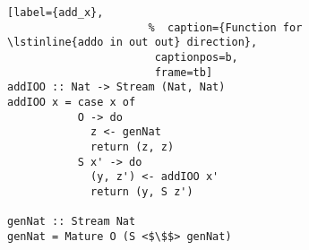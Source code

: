 \begin{figure}[!t]
  \centering
  \begin{minipage}{\columnwidth}
    \begin{lstlisting}[label={add_x},
                      %  caption={Function for \lstinline{addo in out out} direction},
                       captionpos=b,
                       frame=tb]
addIOO :: Nat -> Stream (Nat, Nat)
addIOO x = case x of
           O -> do
             z <- genNat
             return (z, z)
           S x' -> do
             (y, z') <- addIOO x'
             return (y, S z')

genNat :: Stream Nat
genNat = Mature O (S <$\$$> genNat)
    \end{lstlisting}
  \end{minipage}
\end{figure}